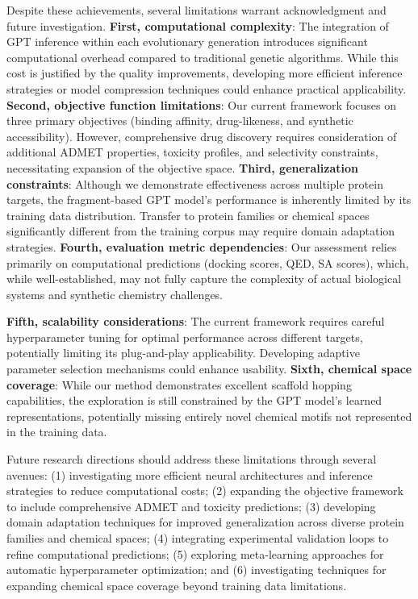 \documentclass[lettersize,journal]{IEEEtran}
\begin{document}
Despite these achievements, several limitations warrant acknowledgment and future investigation. \textbf{First, computational complexity}: The integration of GPT inference within each evolutionary generation introduces significant computational overhead compared to traditional genetic algorithms. While this cost is justified by the quality improvements, developing more efficient inference strategies or model compression techniques could enhance practical applicability. \textbf{Second, objective function limitations}: Our current framework focuses on three primary objectives (binding affinity, drug-likeness, and synthetic accessibility). However, comprehensive drug discovery requires consideration of additional ADMET properties, toxicity profiles, and selectivity constraints, necessitating expansion of the objective space. \textbf{Third, generalization constraints}: Although we demonstrate effectiveness across multiple protein targets, the fragment-based GPT model's performance is inherently limited by its training data distribution. Transfer to protein families or chemical spaces significantly different from the training corpus may require domain adaptation strategies. \textbf{Fourth, evaluation metric dependencies}: Our assessment relies primarily on computational predictions (docking scores, QED, SA scores), which, while well-established, may not fully capture the complexity of actual biological systems and synthetic chemistry challenges.

\textbf{Fifth, scalability considerations}: The current framework requires careful hyperparameter tuning for optimal performance across different targets, potentially limiting its plug-and-play applicability. Developing adaptive parameter selection mechanisms could enhance usability. \textbf{Sixth, chemical space coverage}: While our method demonstrates excellent scaffold hopping capabilities, the exploration is still constrained by the GPT model's learned representations, potentially missing entirely novel chemical motifs not represented in the training data.

Future research directions should address these limitations through several avenues: (1) investigating more efficient neural architectures and inference strategies to reduce computational costs; (2) expanding the objective framework to include comprehensive ADMET and toxicity predictions; (3) developing domain adaptation techniques for improved generalization across diverse protein families and chemical spaces; (4) integrating experimental validation loops to refine computational predictions; (5) exploring meta-learning approaches for automatic hyperparameter optimization; and (6) investigating techniques for expanding chemical space coverage beyond training data limitations.
\end{document}
